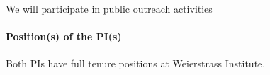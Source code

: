 \documentclass[a4paper,10pt]{article}
\begin{document}
We will participate in public outreach activities

\paragraph{Position(s) of the PI(s)}
Both PIs have full tenure positions at Weierstrass Institute.
\end{document}
